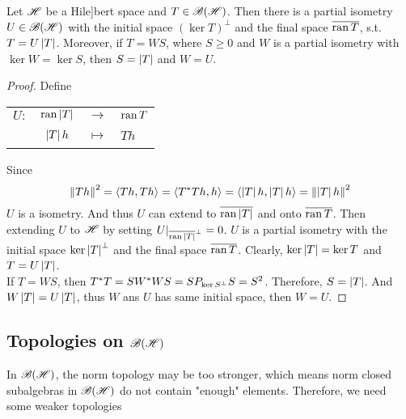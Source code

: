 \documentclass[a4paper,11pt]{report}
\begin{document}
\begin{thm}
	Let $\mathscr{H}$ be a Hile]bert space and $T \in \mathscr{B(H)}$. Then there is a partial isometry $U \in \mathscr{B(H)}$ with the initial space $(\ker{T})^{\bot}$ and the final space $\overline{\operatorname{ran}{T}}$, s.t. $T = U\left\lvert T\right\lvert$. Moreover, if $T=WS$, where $S \geqslant 0$ and $W$ is a partial isometry with $\ker{W}=\ker{S}$, then $S = \left\lvert T\right\lvert$ and $W=U$.
\end{thm}
\begin{proof}
	Define 
	\begin{center}
		\begin{tabular}{l c c l}
			$U \colon$ & $\operatorname{ran}{\left\lvert T\right\lvert}$ & $\longrightarrow$ & $\operatorname{ran}{T}$ \\
			~ & $\left\lvert T\right\lvert h$ & $\longmapsto$ & $Th$
		\end{tabular}
	\end{center}
	Since 
	\begin{equation*}
		\left\lVert Th\right\lVert^2=\langle Th,Th \rangle = \langle T^{*}Th,h \rangle = \langle \left\lvert T\right\lvert h,\left\lvert T\right\lvert h \rangle = \left\lVert\left\lvert T\right\lvert h\right\lVert^2
	\end{equation*}
	$U$ is a isometry. And thus $U$ can extend to $\overline{\operatorname{ran}{\left\lvert T\right\lvert}}$ and onto $\overline{\operatorname{ran}{T}}$. Then extending $U$ to $\mathscr{H}$ by setting $U|_{\overline{\operatorname{ran}{\left\lvert T\right\lvert}}^{\bot}} = 0$. $U$ is a partial isometry with the initial space $\ker{\left\lvert T\right\lvert}^{\bot}$ and the final space $\overline{\operatorname{ran}{T}}$. Clearly, $\ker{\left\lvert T\right\lvert} = \ker{T}$ and $T=U\left\lvert T\right\lvert$.\\
	If $T=WS$, then $T^{*}T=SW^{*}WS = SP_{\ker{S}^{\bot}}S = S^2$. Therefore, $S = \left\lvert T\right\lvert$. And $W\left\lvert T\right\lvert=U\left\lvert T\right\lvert$, thus $W$ ans $U$ has same initial space, then $W=U$.
\end{proof}

\subsection{Topologies on \texorpdfstring{$\mathscr{B(H)}$}{Operator}}

In $\mathscr{B(H)}$, the norm topology may be too stronger, which means norm closed subalgebras in $\mathscr{B(H)}$ do not contain "enough" elements. Therefore, we need some weaker topologies
\end{document}
